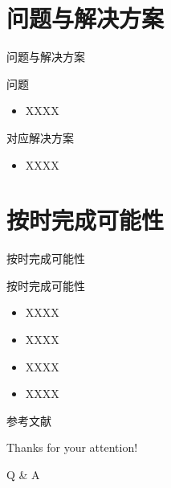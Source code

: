 \documentclass{beamer}
\begin{document}
\section{问题与解决方案}

\begin{frame}{问题与解决方案}
  \begin{block}{问题}
    \begin{itemize}
      \item XXXX
    \end{itemize}
  \end{block}
  \begin{block}{对应解决方案}
    \begin{itemize}
      \item XXXX
    \end{itemize}
  \end{block}
\end{frame}

\section{按时完成可能性}

\begin{frame}{按时完成可能性}
  \begin{block}{按时完成可能性}
    \begin{itemize}
      \setlength{\itemsep}{6pt}
      \item XXXX\cite{xin1994}
      \item XXXX\cite{zhai2015}
      \item XXXX\cite{jones2004}
      \item XXXX\cite{mcmahan2005}
    \end{itemize}
  \end{block}
\end{frame}

\begin{frame}[allowframebreaks]{参考文献}
  
  
\end{frame}

\begin{frame}
	\begin{center}
    {\Huge\calligra Thanks for your attention!}
    \vspace{1cm}

    {\Huge Q \& A}
  \end{center}
\end{frame}

\end{document}
